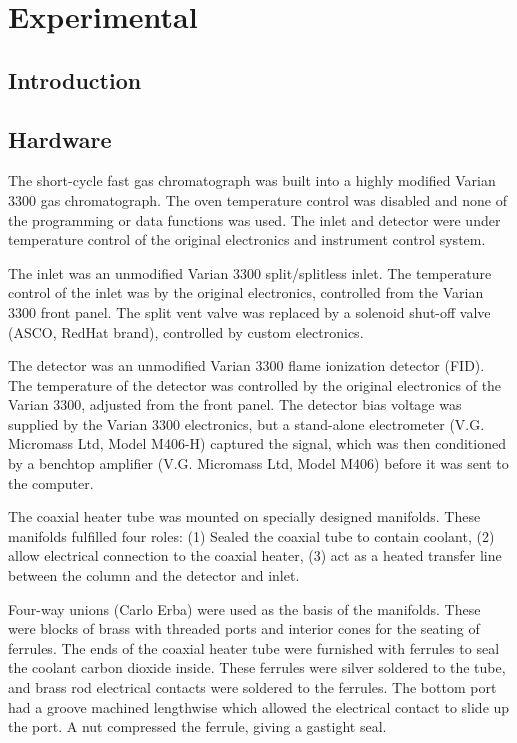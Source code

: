 \documentclass[aip,rsi,preprint,graphicx]{revtex4-1} %
\begin{document}
\section{Experimental}

\subsection{Introduction}

\subsection{Hardware}
The short-cycle fast gas chromatograph was built into a highly modified Varian 3300 gas chromatograph. The oven temperature control was disabled and none of the programming or data functions was used. The inlet and detector were under temperature control of the original electronics and instrument control system. 

The inlet was an unmodified Varian 3300 split/splitless inlet. The temperature control of the inlet was by the original electronics, controlled from the Varian 3300 front panel. The split vent valve was replaced by a solenoid shut-off valve (ASCO, RedHat brand), controlled by custom electronics. 

The detector was an unmodified Varian 3300 flame ionization detector (FID). The temperature of the detector was controlled by the original electronics of the Varian 3300, adjusted from the front panel. The detector bias voltage was supplied by the Varian 3300 electronics, but a stand-alone electrometer (V.G. Micromass Ltd, Model M406-H) captured the signal, which was then conditioned by a benchtop amplifier (V.G. Micromass Ltd, Model M406) before it was sent to the computer. 

The coaxial heater tube was mounted on specially designed manifolds. These manifolds fulfilled four roles: (1) Sealed the coaxial tube to contain coolant, (2) allow electrical connection to the coaxial heater, (3) act as a heated transfer line between the column and the detector and inlet.

Four-way unions (Carlo Erba) were used as the basis of the manifolds. These were blocks of brass with threaded ports and interior cones for the seating of ferrules. The ends of the coaxial heater tube were furnished with ferrules to seal the coolant carbon dioxide inside. These ferrules were silver soldered to the tube, and brass rod electrical contacts were soldered to the ferrules. The bottom port had a groove machined lengthwise which allowed the electrical contact to slide up the port. A nut compressed the ferrule, giving a gastight seal. 
\end{document}
